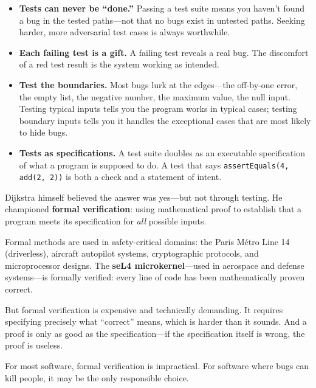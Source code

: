 \documentclass[11pt,letterpaper]{article}
\begin{document}
\begin{itemize}[itemsep=4pt]
    \item \textbf{Tests can never be ``done.''} Passing a test suite means you haven't found a bug in the tested paths---not that no bugs exist in untested paths. Seeking harder, more adversarial test cases is always worthwhile.

    \item \textbf{Each failing test is a gift.} A failing test reveals a real bug. The discomfort of a red test result is the system working as intended.

    \item \textbf{Test the boundaries.} Most bugs lurk at the edges---the off-by-one error, the empty list, the negative number, the maximum value, the null input. Testing typical inputs tells you the program works in typical cases; testing boundary inputs tells you it handles the exceptional cases that are most likely to hide bugs.

    \item \textbf{Tests as specifications.} A test suite doubles as an executable specification of what a program is supposed to do. A test that says \texttt{assertEquals(4, add(2, 2))} is both a check and a statement of intent.
\end{itemize}

\begin{debatebox}
Dijkstra himself believed the answer was yes---but not through testing. He championed \textbf{formal verification}: using mathematical proof to establish that a program meets its specification for \textit{all} possible inputs.

Formal methods are used in safety-critical domains: the Paris M\'{e}tro Line 14 (driverless), aircraft autopilot systems, cryptographic protocols, and microprocessor designs. The \textbf{seL4 microkernel}---used in aerospace and defense systems---is formally verified: every line of code has been mathematically proven correct.

But formal verification is expensive and technically demanding. It requires specifying precisely what ``correct'' means, which is harder than it sounds. And a proof is only as good as the specification---if the specification itself is wrong, the proof is useless.

For most software, formal verification is impractical. For software where bugs can kill people, it may be the only responsible choice.
\end{debatebox}
\end{document}
